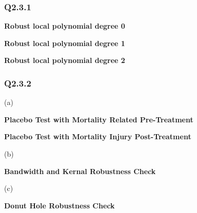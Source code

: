\documentclass[11pt]{article}
\begin{document}
\subsubsection{Q2.3.1}

\begin{center}
	\centering
	\textbf{Robust local polynomial degree 0  }\par\medskip
	\scalebox{1}{
		
	}
\end{center}

\begin{center}
	\centering
	\textbf{Robust local polynomial degree 1  }\par\medskip
	\scalebox{1}{
		
	}
\end{center}


\begin{center}
	\centering
	\textbf{Robust local polynomial degree 2  }\par\medskip
	\scalebox{1}{
		
	}
\end{center}

\subsubsection{Q2.3.2}
(a)

\begin{center}
	\centering
	\textbf{Placebo Test with Mortality Related Pre-Treatment }\par\medskip
	\scalebox{1}{
		
	}
\end{center}

\begin{center}
	\centering
	\textbf{Placebo Test with Mortality Injury Post-Treatment }\par\medskip
	\scalebox{1}{
		
	}
\end{center}

(b)
\begin{center}
	\centering
	\textbf{Bandwidth and Kernal Robustness Check }\par\medskip
	\scalebox{.9}{
		
	}
\end{center}

(c)

\begin{center}
	\centering
	\textbf{Donut Hole Robustness Check }\par\medskip
	\scalebox{1}{
		
	}
\end{center}
\end{document}
